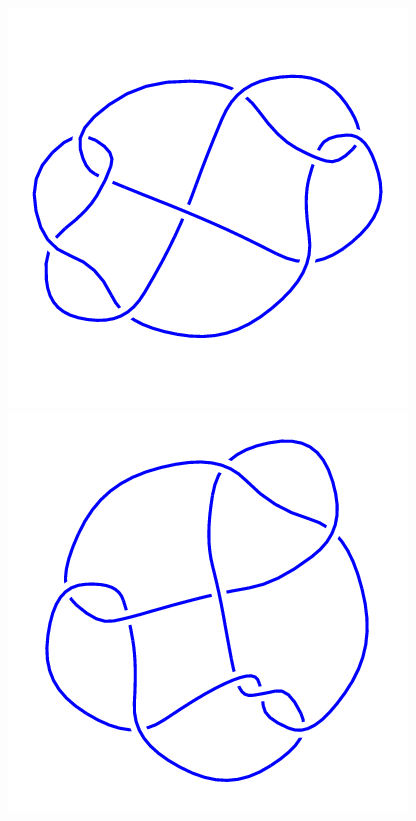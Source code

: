 \begin{figure}[H]
\begin{minipage}[b]{.18\linewidth}
	\end{minipage}
	\begin{minipage}[b]{.18\linewidth}
		\centering
		\includegraphics[width=\linewidth]{../data/9_23.png}
	\end{minipage}
	\begin{minipage}[b]{.18\linewidth}
		\centering
		\includegraphics[width=\linewidth]{../data/9_24.png}

\end{minipage}
\end{figure}
